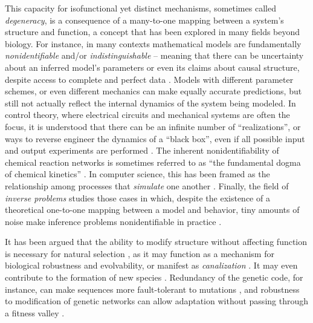 \documentclass{article}
\newcommand{\1}{\mathbbm{1}}
\begin{document}
This capacity for isofunctional yet distinct mechanisms, sometimes called \emph{degeneracy},
is a consequence of a many-to-one mapping between a system's structure and function,
a concept that has been explored in many fields beyond biology.
For instance, in many contexts mathematical models
are fundamentally \emph{nonidentifiable} and/or \emph{indistinguishable} -- meaning that 
there can be uncertainty about an inferred model's parameters or even its claims about
causal structure, despite access to complete and perfect data \citep[e.g.,][]{bellman1970structural, grewal1976identifiability, walter1984structural}. 
Models with different parameter schemes, or even different mechanics 
can make equally accurate predictions,
but still not actually reflect the internal dynamics of the system being modeled.
In control theory, where electrical circuits and mechanical systems are often the focus, 
it is understood that there can be an infinite number of ``realizations'', 
or ways to reverse engineer the dynamics of a ``black box'',
even if all possible input and output experiments are performed 
\citep{kalman1963mathematical, anderson1966equivalence, zadeh1976linear}. 
The inherent nonidentifiability of chemical reaction networks is sometimes
referred to as ``the fundamental dogma of chemical kinetics'' \citep{craciun2008identifiability}.
In computer science, this has been framed as the relationship among processes that \emph{simulate} one another \citep{van2004equivalence}.
Finally,
the field of \emph{inverse problems} studies those cases in which,
despite the existence of a theoretical one-to-one mapping between a model and behavior,
  tiny amounts of noise make inference problems nonidentifiable in practice \citep{petrov2005well}. 

It has been argued that the ability to modify structure without affecting function
is necessary for natural selection \citep{edelman2001degeneracy}, 
as it may function as a mechanism for biological robustness and evolvability, or manifest as 
\emph{canalization} \citep{whitacre2010degeneracy}.
It may even contribute to the formation of new species \citep{gavrilets2014models}. 
Redundancy of the genetic code, for instance,
can make sequences more fault-tolerant to mutations \citep{sonneborn1965degeneracy},
and robustness to modification of genetic networks can allow adaptation 
without passing through a fitness valley \citep{wagner2008robustness}.
\end{document}
